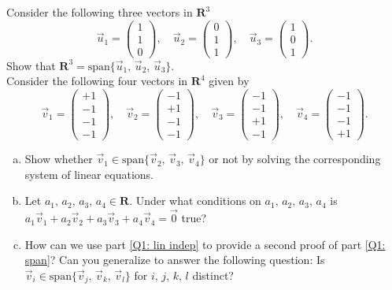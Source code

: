 \documentclass[a4paper,11pt]{article}
\newcommand{\R}{\mathbf{R}}
\begin{document}
 Consider the following three vectors in $\R^3$
\[
  \vec u_1 = \begin{pmatrix}1\\1\\0\end{pmatrix},\quad
  \vec u_2 = \begin{pmatrix}0\\1\\1\end{pmatrix},\quad
  \vec u_3 = \begin{pmatrix}1\\0\\1\end{pmatrix}.
\]
Show that $\R^3=\text{span}\{\vec u_1,\,\vec u_2,\,\vec u_3\}$. \\

 Consider the following four vectors in $\R^4$
given by
\[
  \vec v_1 = \begin{pmatrix}+1 \\ -1 \\ -1 \\ -1\end{pmatrix},  \quad
  \vec v_2 = \begin{pmatrix}-1 \\ +1 \\ -1 \\ -1\end{pmatrix}, \quad
  \vec v_3 = \begin{pmatrix}-1 \\ -1 \\ +1 \\ -1\end{pmatrix}, \quad
  \vec v_4 = \begin{pmatrix}-1 \\ -1 \\ -1 \\ +1\end{pmatrix}.
\]
\begin{enumerate}[(a)]
\item\label{Q1: span} Show whether $\vec v_1 \in \text{span}\{\vec v_2,\,\vec
  v_3,\,\vec v_4\}$ 
  or not by solving the corresponding system of linear equations.
\item\label{Q1: lin indep} Let $a_1,\,a_2,\,a_3,\,a_4 \in \R$. Under what
  conditions on $a_1,\,a_2,\,a_3,\,a_4$ is $a_1\vec v_1+a_2\vec v_2+a_3\vec
  v_3+a_4\vec v_4=\vec{0}$ true?
\item How can we use part \ref{Q1: lin indep} to provide a second proof of part
  \ref{Q1: span}? Can you generalize to answer the following question: Is $\vec
  v_i \in \text{span}\{\vec v_j,\,\vec v_k,\,\vec v_l\}$ for $i,\,j,\,k,\,l$
  distinct? \\
\end{enumerate}
\end{document}

